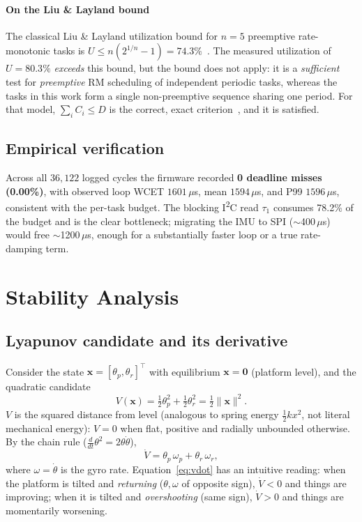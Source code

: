 \documentclass[conference]{IEEEtran}
\begin{document}
\paragraph{On the Liu \& Layland bound}
The classical Liu \& Layland utilization bound for $n=5$ preemptive
rate-monotonic tasks is $U \le n(2^{1/n}-1) = 74.3\%$~\cite{liu1973scheduling}.
The measured utilization of $U=80.3\%$ \emph{exceeds} this bound, but the bound does not
apply: it is a \emph{sufficient} test for \emph{preemptive} RM scheduling of
independent periodic tasks, whereas the tasks in this work form a single non-preemptive
sequence sharing one period. For that model, $\sum_i C_i \le D$ is the correct,
exact criterion~\cite{buttazzo2011hard}, and it is satisfied.

\subsection{Empirical verification}
Across all $36{,}122$ logged cycles the firmware recorded \textbf{0 deadline
  misses (0.00\%)}, with observed loop WCET $1601\,\mu$s, mean $1594\,\mu$s, and
P99 $1596\,\mu$s, consistent with the per-task budget. The blocking
I\textsuperscript{2}C read $\tau_1$ consumes 78.2\% of the budget and is the
clear bottleneck; migrating the IMU to SPI ($\sim$400\,$\mu$s) would free
$\sim$1200\,$\mu$s, enough for a substantially faster loop or a true
rate-damping term.

\section{Stability Analysis}
\label{sec:lyap}
\subsection{Lyapunov candidate and its derivative}
Consider the state $\mathbf x=[\theta_p,\theta_r]^\top$ with equilibrium
$\mathbf x=\mathbf 0$ (platform level), and the quadratic candidate
\begin{equation}
  V(\mathbf x)=\tfrac12\theta_p^2+\tfrac12\theta_r^2=\tfrac12\lVert\mathbf x\rVert^2.
\end{equation}
$V$ is the squared distance from level (analogous to spring energy
$\tfrac12kx^2$, not literal mechanical energy): $V=0$ when flat, positive and
radially unbounded otherwise. By the chain rule
($\tfrac{d}{dt}\theta^2=2\theta\dot\theta$),
\begin{equation}
  \dot V=\theta_p\,\omega_p+\theta_r\,\omega_r,
  \label{eq:vdot}
\end{equation}
where $\omega=\dot\theta$ is the gyro rate. Equation~\eqref{eq:vdot} has an
intuitive reading: when the platform is tilted and \emph{returning}
($\theta,\omega$ of opposite sign), $\dot V<0$ and things are improving; when it
is tilted and \emph{overshooting} (same sign), $\dot V>0$ and things are
momentarily worsening.
\end{document}

